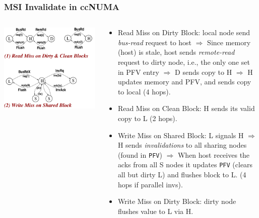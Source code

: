 \documentclass{beamer}
\newcommand{\emp}[1]{\textcolor{DikuRed}{ #1}}
\begin{document}
\begin{frame}[fragile,t]
\frametitle{MSI Invalidate in ccNUMA}

\begin{columns}
\includegraphics[width=45ex]{Figures/FigsInfCoherence/MSIccNUMA}\pause
{}
\begin{scriptsize}
\begin{itemize}
    \item \emp{Read Miss on Dirty Block:} local node send {\em bus-read} request to host 
                $\Rightarrow$ Since memory (host) is stale,
                   host sends {\em remote-read} request to dirty node, i.e., the only one 
                    set in PFV entry $\Rightarrow$ D sends copy to H $\Rightarrow$ H updates
                    memory and PFV, and sends copy to local (4 hops). 

    \item \emp{Read Miss on Clean Block:} H sends its valid copy to L (2 hops).\smallskip

    \item \emp{Write Miss on Shared Block:} L signals H
            $\Rightarrow$ H sends {\em invalidations} to all sharing nodes
            (found in {\tt PFV}) $\Rightarrow$ When host receives the acks from all 
            S nodes it updates {\tt PFV} (clears all but dirty L) and flushes block to L.
            (4 hops if parallel invs).
    \item \emp{Write Miss on Dirty Block:} dirty node flushes value to L via H.
\end  {itemize}
\end{scriptsize}
\end{columns}
\end{frame}
\end{document}
